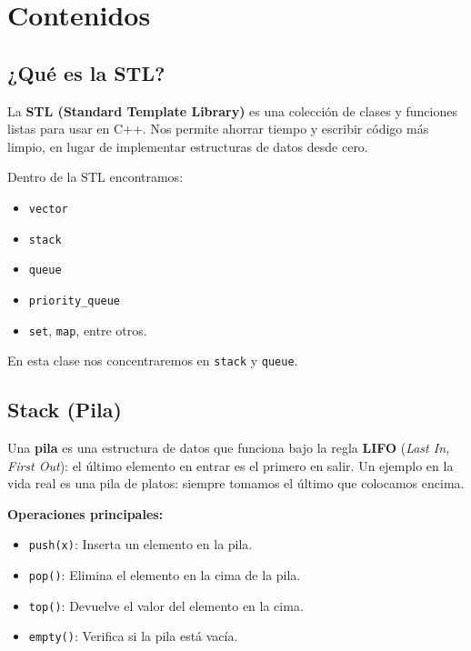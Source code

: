\documentclass{article}
\begin{document}
\section{Contenidos}

\subsection{¿Qué es la STL?}

La \textbf{STL (Standard Template Library)} es una colección de clases y funciones listas para usar en C++.  
Nos permite ahorrar tiempo y escribir código más limpio, en lugar de implementar estructuras de datos desde cero.

Dentro de la STL encontramos:
\begin{itemize}
    \item \texttt{vector}
    \item \texttt{stack}
    \item \texttt{queue}
    \item \texttt{priority\_queue}
    \item \texttt{set}, \texttt{map}, entre otros.
\end{itemize}

En esta clase nos concentraremos en \texttt{stack} y \texttt{queue}.

\vspace{0.5cm}

\subsection{Stack (Pila)}

Una \textbf{pila} es una estructura de datos que funciona bajo la regla \textbf{LIFO} (\textit{Last In, First Out}): el último elemento en entrar es el primero en salir.  
Un ejemplo en la vida real es una pila de platos: siempre tomamos el último que colocamos encima.

\textbf{Operaciones principales:}
\begin{itemize}
    \item \texttt{push(x)}: Inserta un elemento en la pila.
    \item \texttt{pop()}: Elimina el elemento en la cima de la pila.
    \item \texttt{top()}: Devuelve el valor del elemento en la cima.
    \item \texttt{empty()}: Verifica si la pila está vacía.
\end{itemize}
\end{document}
